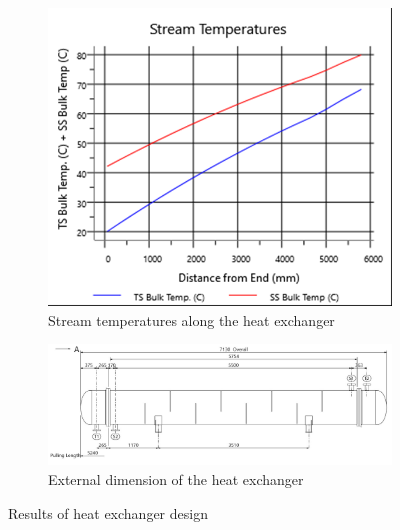 \begin{figure}
	\centering
	\begin{subfigure}[b]{0.5\textwidth}
		\centering
		\includegraphics[trim= 0cm 0.1cm 0.1cm 0.5cm, clip, width=\textwidth]{Figures/Proces_Analysis/HX.png}
		\caption{Stream temperatures along the heat exchanger}
	\end{subfigure}
	\hfill
	\begin{subfigure}[b]{0.5\textwidth}
		\centering
		\includegraphics[width=\textwidth]{Figures/Proces_Analysis/HX2.jpg}
		\caption{External dimension of the heat exchanger}
	\end{subfigure}
	\caption{Results of heat exchanger design}
	\label{fig:Ester_HX}
\end{figure}

